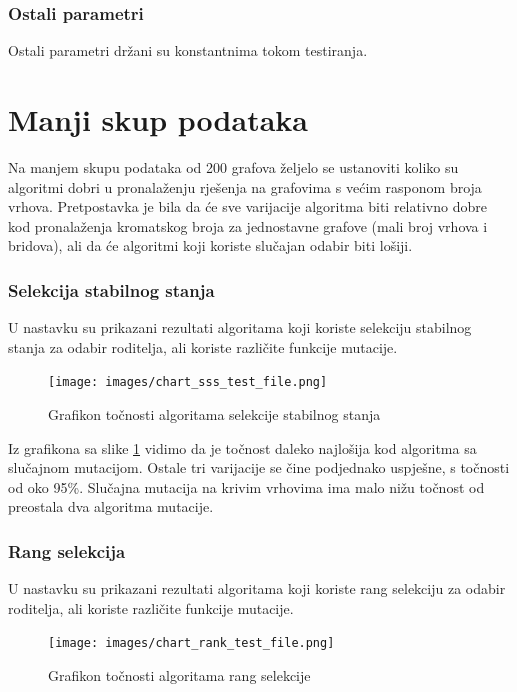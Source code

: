 \documentclass[times, utf8, zavrsni]{fer}
\begin{document}
\subsubsection{Ostali parametri}
Ostali parametri držani su konstantnima tokom testiranja.

\section{Manji skup podataka}
Na manjem skupu podataka od 200 grafova željelo se ustanoviti koliko su algoritmi dobri u pronalaženju rješenja na grafovima s većim rasponom broja vrhova. Pretpostavka je bila da će sve varijacije algoritma biti relativno dobre kod pronalaženja kromatskog broja za jednostavne grafove (mali broj vrhova i bridova), ali da će algoritmi koji koriste slučajan odabir biti lošiji.

\subsubsection{Selekcija stabilnog stanja}
U nastavku su prikazani rezultati algoritama koji koriste selekciju stabilnog stanja za odabir roditelja, ali koriste različite funkcije mutacije.

\begin{figure}[h]
\centering
\texttt{[image: images/chart\_sss\_test\_file.png]}
\caption{Grafikon točnosti algoritama selekcije stabilnog stanja}
\label{fig:grafikon tocnosti algoritama selekcije stabilnog stanja}
\end{figure}

Iz grafikona sa slike \ref{fig:grafikon tocnosti algoritama selekcije stabilnog stanja} vidimo da je točnost daleko najlošija kod algoritma sa slučajnom mutacijom. Ostale tri varijacije se čine podjednako uspješne, s točnosti od oko 95\%. Slučajna mutacija na krivim vrhovima ima malo nižu točnost od preostala dva algoritma mutacije.

\newpage
\subsubsection{Rang selekcija}
U nastavku su prikazani rezultati algoritama koji koriste rang selekciju za odabir roditelja, ali koriste različite funkcije mutacije.

\begin{figure}[h]
\centering
\texttt{[image: images/chart\_rank\_test\_file.png]}
\caption{Grafikon točnosti algoritama rang selekcije}
\label{fig:grafikon tocnosti algoritama rank selekcije}
\end{figure}
\end{document}
